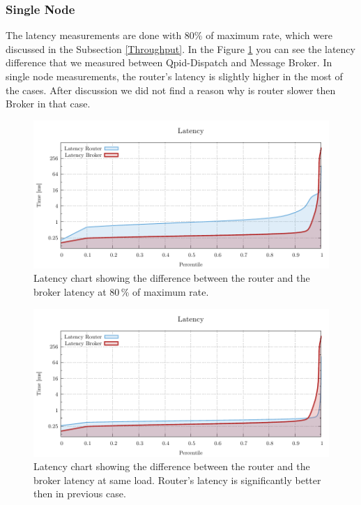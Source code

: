 \subsubsection*{Single Node}
The latency measurements are done with 80\% of maximum rate, which were discussed in the Subsection \ref{Throughput}. In the Figure \ref{fig:latency-single-router} you can see the latency difference that we measured between Qpid-Dispatch and Message Broker. In single node measurements, the router's latency is slightly higher in the most of the cases. After discussion we did not find a reason why is router slower then Broker in that case.


\begin{figure}[H]
	\centering
	\includegraphics[width=1\linewidth]{obrazky-figures/charts/singlepoint-latency.pdf}
	\caption{Latency chart showing the difference between the router and the broker latency at 80\,\% of maximum rate.}
	\label{fig:latency-single-router}
\end{figure}

\begin{figure}[H]
	\centering
	\includegraphics[width=1\linewidth]{obrazky-figures/charts/singlepoint-latency-18k.pdf}
	\caption{Latency chart showing the difference between the router and the broker latency at same load. Router's latency is significantly better then in previous case.}
	\label{fig:latency-single-same-load}
\end{figure}

